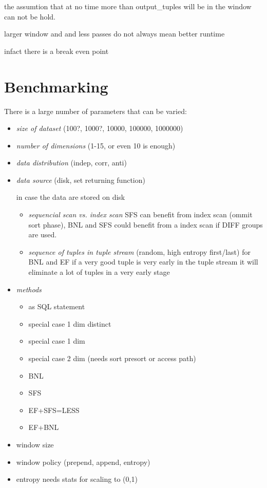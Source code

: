 the assumtion that at no time more than output\_tuples will be in the window can not be hold.

larger window and and less passes do not always mean better runtime

infact there is a break even point


\clearpage %

\section{Benchmarking}

There is a large number of parameters that can be varied:

\begin{itemize}
\item \emph{size of dataset} (100?, 1000?, 10000, 100000, 1000000)
\item \emph{number of dimensions} (1-15, or even 10 is enough)
\item \emph{data distribution} (indep, corr, anti)
\item \emph{data source} (disk, set returning function)

in case the data are stored on disk
\begin{itemize}
\item \emph{sequencial scan vs. index scan} SFS can benefit from index scan (ommit sort phase), BNL and SFS could benefit from a index scan if DIFF groups are used.
\item \emph{sequence of tuples in tuple stream} (random, high entropy first/last) for BNL and EF if a very good tuple is very early in the tuple stream it will eliminate a lot of tuples in a very early stage
\end{itemize}
\item \emph{methods}

\begin{itemize}
\item as SQL statement
\item special case 1 dim distinct
\item special case 1 dim 
\item special case 2 dim (needs sort presort or access path)
\item BNL
\item SFS
\item EF+SFS=LESS
\item EF+BNL
\end{itemize}

\item window size
\item window policy (prepend, append, entropy)
\item entropy needs stats for scaling to (0,1)

\end{itemize}

